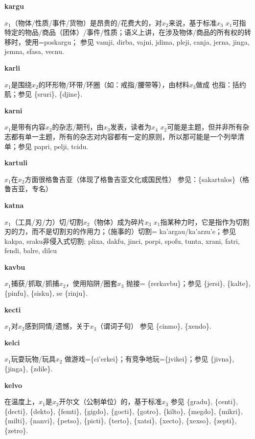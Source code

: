 \documentclass[notitlepage,twocolumn,a4paper,10pt]{book}
\begin{document}
{\sffamily\bfseries kargu} $x_1$（物体\slash{}性质\slash{}事件\slash{}货物）是昂贵的\slash{}花费大的，对$x_2$来说，基于标准$x_3$ \textemdash{} $x_1$可指特定的物品\slash{}商品（团体）\slash{}事件\slash{}性质；语义上讲，在涉及物体\slash{}商品的所有权的转移时，使用={poskargu}； 参见 {vamji}, {dirba}, {vajni}, {jdima}, {pleji}, {canja}, {jerna}, {jinga}, {jemna}, {sfasa}, {vecnu}.

{\sffamily\bfseries karli} $x_1$是围绕$x_2$的环形物\slash{}环带\slash{}环圈（如：戒指\slash{}腰带等），由材料$x_3$做成 \textemdash{} 也指：括约肌；参见 \{sruri\}, \{djine\}.

{\sffamily\bfseries karni} $x_1$是带有内容$x_2$的杂志\slash{}期刊，由$x_3$发表，读者为$x_4$ \textemdash{} $x_2$可能是主题，但并非所有杂志都有单一主题，所有的杂志对内容都有一定的原则，所以那可能是一个列举清单；参见 {papri}, {pelji}, {tcidu}.

{\sffamily\bfseries kartuli} $x_1$在$x_2$方面很格鲁吉亚（体现了格鲁吉亚文化或国民性） \textemdash{} 参见：\{sakartulos\}（格鲁吉亚，专名）

{\sffamily\bfseries katna}\enspace {\ttfamily\bfseries[        ka'a]}  $x_1$（工具\slash{}刃\slash{}力）切\slash{}切割$x_2$（物体）成为碎片$x_3$ \textemdash{} $x_1$指某种力时，它是指作为切割刃的力，而不是切割刃的作用力；（施事的）切割= {ka'argau}\slash{}{ka'arzu'e}；参见 {kakpa}, {sraku}非侵入式切割; {plixa}, {dakfu}, {jinci}, {porpi}, {spofu}, {tunta}, {xrani}, {fatri}, {fendi}, {balre}, {dilcu}

{\sffamily\bfseries kavbu}\enspace {\ttfamily\bfseries[kav]}  $x_1$捕获\slash{}抓取\slash{}抓捕$x_2$，使用陷阱\slash{}圈套$x_3$ \textemdash{} 抛接= \{rerkavbu\}；参见 \{jersi\}, \{kalte\}, \{pinfu\}, \{sisku\}, se \{rinju\}.

{\sffamily\bfseries kecti}\enspace {\ttfamily\bfseries[kec     ke'i]}  $x_1$对$x_2$感到同情\slash{}遗憾，关于$x_3$（谓词子句） \textemdash{} 参见 \{cinmo\}, \{xendo\}.

{\sffamily\bfseries kelci}  $x_1$玩耍玩物\slash{}玩具$x_2$ \textemdash{} 做游戏=\{ci'erkei\}；有竞争地玩=\{jvikei\}；参见 \{jivna\}, \{jinga\}, \{zdile\}.

{\sffamily\bfseries kelvo}\enspace {\ttfamily\bfseries[        ke'o]}  在温度上，$x_1$是$x_2$开尔文（公制单位）的，基于标准$x_3$ \textemdash{} 参见 \{gradu\}, \{centi\}, \{decti\}, \{dekto\}, \{femti\}, \{gigdo\}, \{gocti\}, \{gotro\}, \{kilto\}, \{megdo\}, \{mikri\}, \{milti\}, \{nanvi\}, \{petso\}, \{picti\}, \{terto\}, \{xatsi\}, \{xecto\}, \{xexso\}, \{zepti\}, \{zetro\}.
\end{document}
